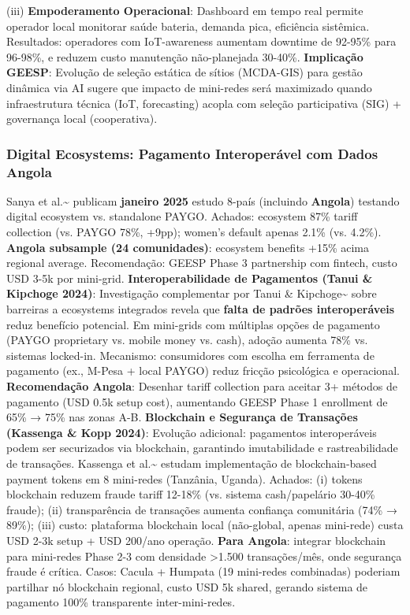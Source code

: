\documentclass[12pt, a4paper]{article}
\begin{document}
(iii)
\textbf{Empoderamento Operacional}: Dashboard em tempo real permite operador local monitorar saúde bateria, demanda pica, eficiência sistêmica. Resultados: operadores com IoT-awareness aumentam downtime de 92-95\% para 96-98\%, e reduzem custo manutenção não-planejada 30-40\%.
\textbf{Implicação GEESP}: Evolução de seleção estática de sítios (MCDA-GIS) para gestão dinâmica via AI sugere que impacto de mini-redes será maximizado quando infraestrutura técnica (IoT, forecasting) acopla com seleção participativa (SIG) + governança local (cooperativa).

\subsubsection{Digital Ecosystems: Pagamento Interoperável com Dados Angola}

Sanya et al.\textasciitilde{}\citep{Sanya2025} publicam
\textbf{janeiro 2025} estudo 8-país (incluindo
\textbf{Angola}) testando digital ecosystem vs. standalone PAYGO. Achados: ecosystem 87\% tariff collection (vs. PAYGO 78\%, +9pp); women's default apenas 2.1\% (vs. 4.2\%).
\textbf{Angola subsample (24 comunidades)}: ecosystem benefits +15\% acima regional average. Recomendação: GEESP Phase 3 partnership com fintech, custo USD 3-5k por mini-grid.
\textbf{Interoperabilidade de Pagamentos (Tanui \& Kipchoge 2024)}: Investigação complementar por Tanui \& Kipchoge\textasciitilde{}\citep{Tanui2024} sobre barreiras a ecosystems integrados revela que
\textbf{falta de padrões interoperáveis} reduz benefício potencial. Em mini-grids com múltiplas opções de pagamento (PAYGO proprietary vs. mobile money vs. cash), adoção aumenta 78\% vs. sistemas locked-in. Mecanismo: consumidores com escolha em ferramenta de pagamento (ex., M-Pesa + local PAYGO) reduz fricção psicológica e operacional.
\textbf{Recomendação Angola}: Desenhar tariff collection para aceitar 3+ métodos de pagamento (USD 0.5k setup cost), aumentando GEESP Phase 1 enrollment de 65\% → 75\% nas zonas A-B.
\textbf{Blockchain e Segurança de Transações (Kassenga \& Kopp 2024)}: Evolução adicional: pagamentos interoperáveis podem ser securizados via blockchain, garantindo imutabilidade e rastreabilidade de transações. Kassenga et al.\textasciitilde{}\citep{Kassenga2024} estudam implementação de blockchain-based payment tokens em 8 mini-redes (Tanzânia, Uganda). Achados: (i) tokens blockchain reduzem fraude tariff 12-18\% (vs. sistema cash/papelário 30-40\% fraude); (ii) transparência de transações aumenta confiança comunitária (74\% → 89\%); (iii) custo: plataforma blockchain local (não-global, apenas mini-rede) custa USD 2-3k setup + USD 200/ano operação.
\textbf{Para Angola}: integrar blockchain para mini-redes Phase 2-3 com densidade >1.500 transações/mês, onde segurança fraude é crítica. Casos: Cacula + Humpata (19 mini-redes combinadas) poderiam partilhar nó blockchain regional, custo USD 5k shared, gerando sistema de pagamento 100\% transparente inter-mini-redes.
\end{document}
